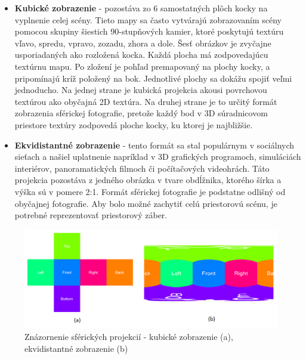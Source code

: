 \documentclass[slovak,master,dept460,male,cpp,cpdeclaration]{diploma}
\begin{document}
\begin{itemize}
\item \textbf{Kubické zobrazenie} -  pozostáva zo 6 samostatných plôch kocky na vyplnenie celej scény. Tieto mapy sa často vytvárajú zobrazovaním scény pomocou skupiny šiestich 90-stupňových kamier, ktoré poskytujú textúru vľavo, spredu, vpravo, zozadu, zhora a dole. Šesť obrázkov je zvyčajne usporiadaných ako rozložená kocka. Každá plocha  má zodpovedajúcu textúrnu mapu. Po zložení je pohľad premapovaný na plochy kocky, a pripomínajú kríž položený na bok. Jednotlivé plochy  sa dokážu spojiť veľmi jednoducho. Na jednej strane je kubická projekcia akousi povrchovou textúrou ako obyčajná 2D textúra. Na druhej strane je to určitý formát zobrazenia sférickej fotografie, pretože každý bod v 3D súradnicovom priestore textúry zodpovedá ploche kocky, ku ktorej je najbližšie.

\item \textbf{Ekvidistantné zobrazenie} - tento formát sa stal populárnym v sociálnych sieťach a našiel uplatnenie napríklad v 3D grafických programoch, simuláciách interiérov, panoramatických filmoch či počítačových videohrách. Táto projekcia pozostáva z jedného obrázka v tvare obdĺžnika, ktorého šírka a výška sú v pomere 2:1. Formát sférickej fotografie je podstatne odlišný od obyčajnej fotografie. Aby bolo možné zachytiť celú priestorovú scénu, je potrebné reprezentovať priestorový záber.
\end{itemize}

\begin{figure}[H]
	\centering
	\includegraphics[width=1\textwidth]{Figures/sphericalModel2.png}
	\caption{Znázornenie sférických projekcií - kubické zobrazenie (a), ekvidistantné zobrazenie (b)}
	\label{fig:sphericalModel2}
\end{figure}
\end{document}
